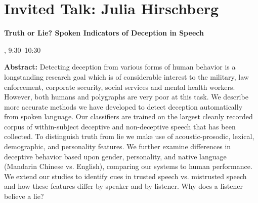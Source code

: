 \section{Invited Talk: Julia Hirschberg}


\begin{center}
\begin{Large}
{\bfseries\Large Truth or Lie? Spoken Indicators of Deception in Speech}\vspace{1em}\par
\end{Large}


\daydateyear, 9:30--10:30 \vspace{1em}\\
\vspace{1em}\par
\end{center}

\noindent
{\bfseries Abstract:} Detecting deception from various forms of human behavior is a longstanding research goal which is of considerable interest to the military, law enforcement, corporate security, social services and mental health workers. However, both humans and polygraphs are very poor at this task. We describe more accurate methods we have developed to detect deception automatically from spoken language. Our classifiers are trained on the largest cleanly recorded corpus of within-subject deceptive and non-deceptive speech that has been collected. To distinguish truth from lie we make use of acoustic-prosodic, lexical, demographic, and personality features. We further examine differences in deceptive behavior based upon gender, personality, and native language (Mandarin Chinese vs. English), comparing our systems to human performance. We extend our studies to identify cues in trusted speech vs. mistrusted speech and how these features differ by speaker and by listener. Why does a listener believe a lie? 

